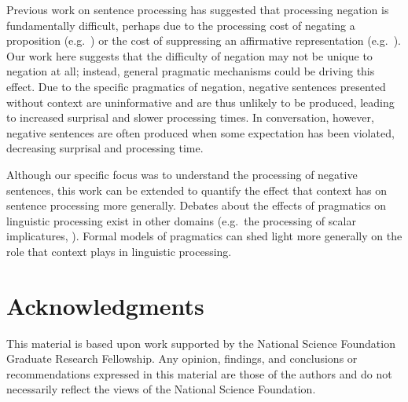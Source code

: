 \documentclass[10pt,letterpaper]{article}
\begin{document}
Previous work on sentence processing has suggested that processing negation is fundamentally difficult, perhaps due to the processing cost of negating a proposition (e.g.\ ) or the cost of suppressing an affirmative representation (e.g.\ ).  Our work here suggests that the difficulty of negation may not be unique to negation at all; instead, general pragmatic mechanisms could be driving this effect.  Due to the specific pragmatics of negation, negative sentences presented without context are uninformative and are thus unlikely to be produced, leading to increased surprisal and slower processing times.  In conversation, however, negative sentences are often produced when some expectation has been violated, decreasing surprisal and processing time.  

Although our specific focus was to understand the processing of negative sentences, this work can be extended to quantify the effect that context has on sentence processing more generally.  Debates about the effects of pragmatics on linguistic processing exist in other domains (e.g.\ the processing of scalar implicatures, ).  Formal models of pragmatics can shed light more generally on the role that context plays in linguistic processing. 

\section{Acknowledgments}
This material is based upon work supported by the National Science Foundation Graduate Research Fellowship. Any opinion, findings, and conclusions or recommendations expressed in this material are those of the authors and do not necessarily reflect the views of the National Science Foundation.




\setlength{\bibleftmargin}{.125in}
\setlength{\bibindent}{-\bibleftmargin}


\end{document}
